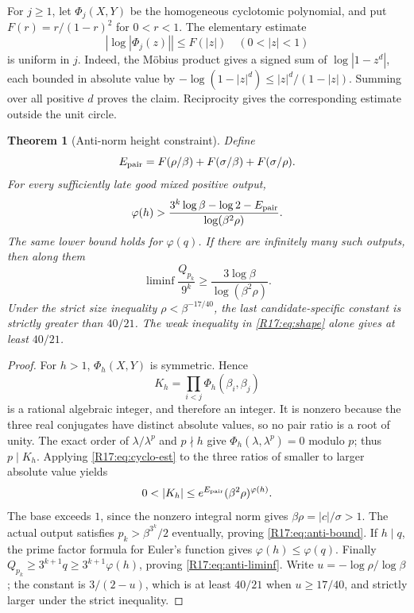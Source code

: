 \documentclass[11pt,a4paper]{article}
\newtheorem{theorem}{Theorem}[section]
\theoremstyle{definition}\newtheorem{definition}[theorem]{Definition}
\theoremstyle{remark}\newtheorem{remark}[theorem]{Remark}
\begin{document}
For $j\ge1$, let $\Phi_j(X,Y)$ be the homogeneous cyclotomic polynomial,
and put $F(r)=r/(1-r)^2$ for $0<r<1$.
The elementary estimate
\begin{equation}\label{R17:eq:cyclo-est}
 \left|\log|\Phi_j(z)|\right|\le F(|z|)\quad(0<|z|<1)
\end{equation}
is uniform in $j$. Indeed, the M\"obius product gives a signed sum of
$\log|1-z^d|$, each bounded in absolute value by
$-\log(1-|z|^d)\le|z|^d/(1-|z|)$. Summing over all positive $d$
proves the claim. Reciprocity gives the corresponding estimate outside
the unit circle.

\begin{theorem}[Anti-norm height constraint]\label{R17:thm:anti}
Define
\[
 E_{\rm pair}=F(\rho/\beta)+F(\sigma/\beta)+F(\sigma/\rho).
\]
For every sufficiently late good mixed positive output,
\begin{equation}\label{R17:eq:anti-bound}
 \varphi(h)>
 \frac{3^k\log\beta-\log2-E_{\rm pair}}
      {\log(\beta^2\rho)}.
\end{equation}
The same lower bound holds for $\varphi(q)$. If there are infinitely
many such outputs, then along them
\begin{equation}\label{R17:eq:anti-liminf}
 \liminf\frac{Q_{p_k}}{9^k}
 \ge\frac{3\log\beta}{\log(\beta^2\rho)}.
\end{equation}
Under the strict size inequality $\rho<\beta^{-17/40}$, the last
candidate-specific constant is strictly greater than $40/21$.
The weak inequality in \eqref{R17:eq:shape} alone gives at least $40/21$.
\end{theorem}
\begin{proof}
For $h>1$, $\Phi_h(X,Y)$ is symmetric. Hence
\[
 K_h=\prod_{i<j}\Phi_h(\beta_i,\beta_j)
\]
is a rational algebraic integer, and therefore an integer.
It is nonzero because the three real conjugates have distinct absolute
values, so no pair ratio is a root of unity.
The exact order of $\lambda/\lambda^p$ and $p\nmid h$ give
$\Phi_h(\lambda,\lambda^p)=0$ modulo $p$; thus $p\mid K_h$.
Applying \eqref{R17:eq:cyclo-est} to the three ratios of smaller to larger
absolute value yields
\[
 0<|K_h|\le e^{E_{\rm pair}}(\beta^2\rho)^{\varphi(h)}.
\]
The base exceeds $1$, since the nonzero integral norm gives
$\beta\rho=|c|/\sigma>1$. The actual output satisfies
$p_k>\beta^{3^k}/2$ eventually, proving \eqref{R17:eq:anti-bound}.
If $h\mid q$, the prime factor formula for Euler's function gives
$\varphi(h)\le\varphi(q)$. Finally
$Q_{p_k}\ge3^{k+1}q\ge3^{k+1}\varphi(h)$, proving
\eqref{R17:eq:anti-liminf}. Write $u=-\log\rho/\log\beta$; the constant
is $3/(2-u)$, which is at least $40/21$ when $u\ge17/40$, and
strictly larger under the strict inequality.
\end{proof}
\end{document}
